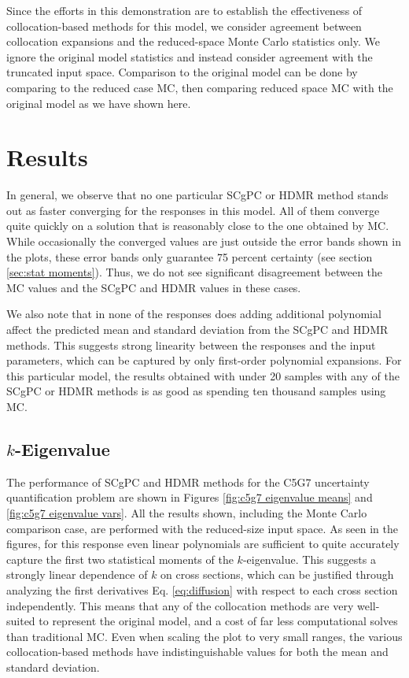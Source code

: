 Since the efforts in this demonstration are to establish the effectiveness of collocation-based methods for
this model, we consider agreement between collocation expansions and the reduced-space Monte Carlo statistics only.
We ignore the original model statistics and instead consider agreement with the truncated input space.
Comparison to the original model can be done by comparing to the reduced case MC, then comparing reduced space
MC with the original model as we have shown here.

\section{Results}
In general, we observe that no one particular SCgPC or HDMR method stands out as faster converging for the
responses in this model.  All of them converge quite quickly on a solution that is reasonably close to the one
obtained by MC.  While occasionally the converged values are just outside the error bands shown in the plots,
these error bands only guarantee 75 percent certainty (see section \ref{sec:stat moments}).  Thus, we do not
see significant disagreement between the MC values and the SCgPC and HDMR values in these cases.

We also note that in none of the responses does adding additional polynomial affect the predicted mean and
standard deviation from the SCgPC and HDMR methods.  This suggests strong linearity between the responses and
the input parameters, which can be captured by only first-order polynomial expansions.  For this particular
model, the results obtained with under 20 samples with any of the SCgPC or HDMR methods is as good as spending
ten thousand samples using MC.

\subsection{$k$-Eigenvalue}
The performance of SCgPC and HDMR methods for the C5G7 uncertainty quantification problem are shown in Figures
\ref{fig:c5g7 eigenvalue means} and \ref{fig:c5g7 eigenvalue vars}.  All the results shown, including the
Monte Carlo comparison case, are performed with the reduced-size input space.
As seen in the figures, for this response even linear polynomials are sufficient to quite accurately capture the first
two statistical moments of the $k$-eigenvalue.  This suggests a strongly linear dependence of
$k$ on cross sections, which can be justified through analyzing the first derivatives Eq. \ref{eq:diffusion}
with respect to each cross section independently.  This means that any of the collocation methods are very
well-suited to represent the original model, and a cost of far less computational solves than traditional
MC.  Even when scaling the plot to very small ranges, the various collocation-based methods have
indistinguishable values for both the mean and standard deviation.

